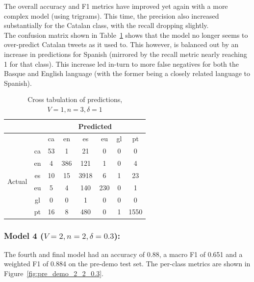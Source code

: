 \documentclass[runningheads]{llncs}
\begin{document}
The overall accuracy and F1 metrics have improved yet again with a more complex model (using trigrams). This time, the precision also increased substantially for the Catalan class, with the recall dropping slightly. \\

The confusion matrix shown in Table~\ref{tab:pre_demo_confusion_1_3_1} shows that the model no longer seems to over-predict Catalan tweets as it used to. This however, is balanced out by an increase in predictions for Spanish (mirrored by the recall metric nearly reaching 1 for that class). This increase led in-turn to more false negatives for both the Basque and English language (with the former being a closely related language to Spanish).

\begin{table}
	\centering
	\caption{Cross tabulation of predictions, $V=1, n=3, \delta=1$}
	\label{tab:pre_demo_confusion_1_3_1}
	\begin{tabular}{|c|c|c|c|c|c|c|c|} \hline
		& & \multicolumn{6}{c|}{Predicted} \\ \hline
		& &  ca &   en &    es &   eu &  gl &    pt \\ \hline
		\multirow{6}{*}{Actual} & ca   &  53 &    1 &    21 &    0 &   0 &     0 \\
		& en   &   4 &  386 &   121 &    1 &   0 &     4 \\
		& es   &  10 &   15 &  3918 &    6 &   1 &    23 \\
		& eu   &   5 &    4 &   140 &  230 &   0 &     1 \\
		& gl   &   0 &    0 &     1 &    0 &   0 &     0 \\
		& pt   &  16 &    8 &   480 &    0 &   1 &  1550 \\ \hline
	\end{tabular}
\end{table}



\subsubsection{Model 4 ($V=2, n=2, \delta=0.3$): }
The fourth and final model had an accuracy of 0.88, a macro F1 of 0.651 and a weighted F1 of 0.884 on the pre-demo test set. The per-class metrics are shown in Figure~\ref{fig:pre_demo_2_2_0.3}. \\
\end{document}
